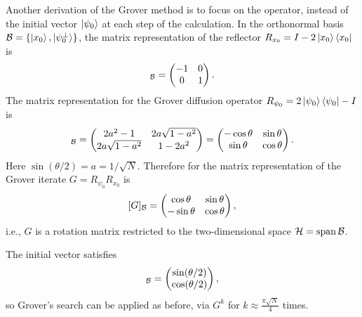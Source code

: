 Another derivation of the Grover method is to focus on the operator, instead of the initial vector $\ket{\psi_0}$ at each step of the calculation.
In the orthonormal basis $\mathcal{B}=\{\ket{x_0},\ket{\psi_0^{\perp}}\}$, the matrix representation of the reflector $R_{x_0}=I-2\ket{x_0}\bra{x_0}$ is
\begin{equation}
[R_{x_0}]_{\mc{B}}=\begin{pmatrix}
-1 & 0 \\
0 & 1
\end{pmatrix}.
\end{equation}
The matrix representation for the Grover diffusion operator $R_{\psi_0}=2\ket{\psi_0}\bra{\psi_0}-I$ is
\begin{equation}
[R_{\psi_0}]_{\mc{B}}=\begin{pmatrix}
2a^2-1 & 2a\sqrt{1-a^2} \\
2a\sqrt{1-a^2} & 1-2a^2
\end{pmatrix}=\begin{pmatrix}
-\cos \theta & \sin\theta \\
\sin\theta & \cos\theta
\end{pmatrix}.
\end{equation}
Here $\sin(\theta/2)=a=1/\sqrt{N}$. Therefore for the matrix representation of the Grover iterate $G=R_{\psi_0}R_{x_0}$ is
\begin{equation}
\label{eqn:grover_step_matrix}
[G]_{\mathcal{B}}=\begin{pmatrix}
\cos \theta & \sin\theta \\
-\sin\theta & \cos\theta
\end{pmatrix},
\end{equation}
i.e., $G$ is a rotation matrix restricted to the two-dimensional space $\mathcal{H}=\operatorname{span}\mathcal{B}$.

The initial vector satisfies 
\begin{equation}
[\ket{\psi_0}]_{\mc{B}}=\begin{pmatrix}
\sin(\theta/2)\\
\cos(\theta/2)
\end{pmatrix},
\end{equation}
so Grover's search can be applied as before, via $G^k$ for $k\approx \frac{\pi\sqrt{N}}{4}$  times.



